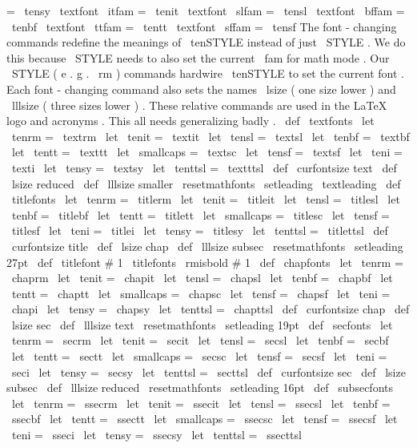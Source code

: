 {{{=
\
tensy
\
textfont
\
itfam
=
\
tenit
\
textfont
\
slfam
=
\
tensl
\
textfont
\
bffam
=
\
tenbf
\
textfont
\
ttfam
=
\
tentt
\
textfont
\
sffam
=
\
tensf
}
%
The
font
-
changing
commands
redefine
the
meanings
of
\
tenSTYLE
instead
%
of
just
\
STYLE
.
We
do
this
because
\
STYLE
needs
to
also
set
the
%
current
\
fam
for
math
mode
.
Our
\
STYLE
(
e
.
g
.
\
rm
)
commands
hardwire
%
\
tenSTYLE
to
set
the
current
font
.
%
%
Each
font
-
changing
command
also
sets
the
names
\
lsize
(
one
size
lower
)
%
and
\
lllsize
(
three
sizes
lower
)
.
These
relative
commands
are
used
in
%
the
LaTeX
logo
and
acronyms
.
%
%
This
all
needs
generalizing
badly
.
%
\
def
\
textfonts
{
%
\
let
\
tenrm
=
\
textrm
\
let
\
tenit
=
\
textit
\
let
\
tensl
=
\
textsl
\
let
\
tenbf
=
\
textbf
\
let
\
tentt
=
\
texttt
\
let
\
smallcaps
=
\
textsc
\
let
\
tensf
=
\
textsf
\
let
\
teni
=
\
texti
\
let
\
tensy
=
\
textsy
\
let
\
tenttsl
=
\
textttsl
\
def
\
curfontsize
{
text
}
%
\
def
\
lsize
{
reduced
}
\
def
\
lllsize
{
smaller
}
%
\
resetmathfonts
\
setleading
{
\
textleading
}
}
\
def
\
titlefonts
{
%
\
let
\
tenrm
=
\
titlerm
\
let
\
tenit
=
\
titleit
\
let
\
tensl
=
\
titlesl
\
let
\
tenbf
=
\
titlebf
\
let
\
tentt
=
\
titlett
\
let
\
smallcaps
=
\
titlesc
\
let
\
tensf
=
\
titlesf
\
let
\
teni
=
\
titlei
\
let
\
tensy
=
\
titlesy
\
let
\
tenttsl
=
\
titlettsl
\
def
\
curfontsize
{
title
}
%
\
def
\
lsize
{
chap
}
\
def
\
lllsize
{
subsec
}
%
\
resetmathfonts
\
setleading
{
27pt
}
}
\
def
\
titlefont
#
1
{
{
\
titlefonts
\
rmisbold
#
1
}
}
\
def
\
chapfonts
{
%
\
let
\
tenrm
=
\
chaprm
\
let
\
tenit
=
\
chapit
\
let
\
tensl
=
\
chapsl
\
let
\
tenbf
=
\
chapbf
\
let
\
tentt
=
\
chaptt
\
let
\
smallcaps
=
\
chapsc
\
let
\
tensf
=
\
chapsf
\
let
\
teni
=
\
chapi
\
let
\
tensy
=
\
chapsy
\
let
\
tenttsl
=
\
chapttsl
\
def
\
curfontsize
{
chap
}
%
\
def
\
lsize
{
sec
}
\
def
\
lllsize
{
text
}
%
\
resetmathfonts
\
setleading
{
19pt
}
}
\
def
\
secfonts
{
%
\
let
\
tenrm
=
\
secrm
\
let
\
tenit
=
\
secit
\
let
\
tensl
=
\
secsl
\
let
\
tenbf
=
\
secbf
\
let
\
tentt
=
\
sectt
\
let
\
smallcaps
=
\
secsc
\
let
\
tensf
=
\
secsf
\
let
\
teni
=
\
seci
\
let
\
tensy
=
\
secsy
\
let
\
tenttsl
=
\
secttsl
\
def
\
curfontsize
{
sec
}
%
\
def
\
lsize
{
subsec
}
\
def
\
lllsize
{
reduced
}
%
\
resetmathfonts
\
setleading
{
16pt
}
}
\
def
\
subsecfonts
{
%
\
let
\
tenrm
=
\
ssecrm
\
let
\
tenit
=
\
ssecit
\
let
\
tensl
=
\
ssecsl
\
let
\
tenbf
=
\
ssecbf
\
let
\
tentt
=
\
ssectt
\
let
\
smallcaps
=
\
ssecsc
\
let
\
tensf
=
\
ssecsf
\
let
\
teni
=
\
sseci
\
let
\
tensy
=
\
ssecsy
\
let
\
tenttsl
=
\
ssecttsl
}}}
